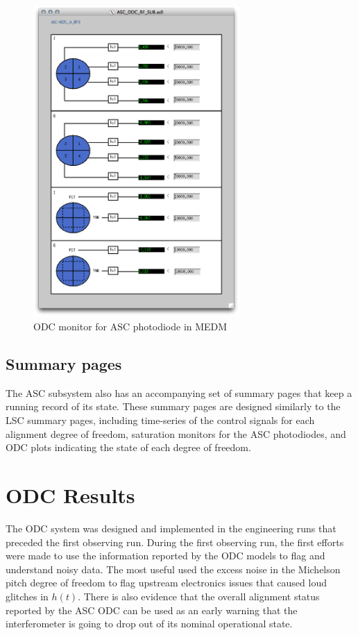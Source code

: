 \begin{figure}[ht!]
\includegraphics[width=0.7\textwidth]{figures/ODC/PD_screen}
\caption[ASC ODC Photodiode Monitor in MEDM]{ODC monitor for ASC photodiode in MEDM}
\label{fig:odc-pd-screen}
\end{figure}

\subsection{Summary pages}

The ASC subsystem also has an accompanying set of summary pages that keep a running 
record of its state. These summary pages are designed similarly to the LSC summary 
pages, including time-series of the control signals for each alignment degree of freedom, 
saturation monitors for the ASC photodiodes,  
and ODC plots indicating the state of each degree of freedom.

\section{ODC Results}

The ODC system was designed and implemented in the engineering runs that preceded the 
first observing run. During the first observing run, the first efforts were made to 
use the information reported by the ODC models to flag and understand noisy data. 
The most useful 
used the excess noise in the Michelson pitch degree of freedom to flag upstream 
electronics issues that caused loud glitches in $h(t)$. There is also evidence 
that the overall alignment status reported by the ASC ODC can be used as an early 
warning that the interferometer is going to drop out of its nominal operational 
state.

